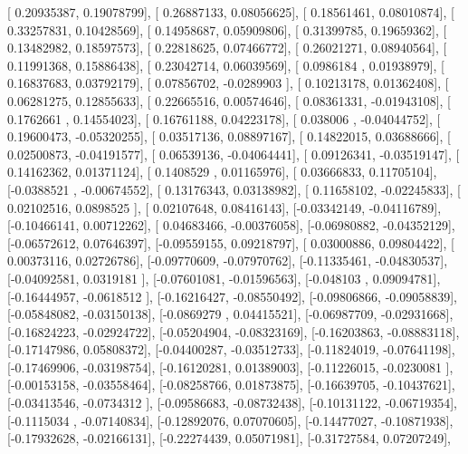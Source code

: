\documentclass{article}
\begin{document}
       [ 0.20935387,  0.19078799],
       [ 0.26887133,  0.08056625],
       [ 0.18561461,  0.08010874],
       [ 0.33257831,  0.10428569],
       [ 0.14958687,  0.05909806],
       [ 0.31399785,  0.19659362],
       [ 0.13482982,  0.18597573],
       [ 0.22818625,  0.07466772],
       [ 0.26021271,  0.08940564],
       [ 0.11991368,  0.15886438],
       [ 0.23042714,  0.06039569],
       [ 0.0986184 ,  0.01938979],
       [ 0.16837683,  0.03792179],
       [ 0.07856702, -0.0289903 ],
       [ 0.10213178,  0.01362408],
       [ 0.06281275,  0.12855633],
       [ 0.22665516,  0.00574646],
       [ 0.08361331, -0.01943108],
       [ 0.1762661 ,  0.14554023],
       [ 0.16761188,  0.04223178],
       [ 0.038006  , -0.04044752],
       [ 0.19600473, -0.05320255],
       [ 0.03517136,  0.08897167],
       [ 0.14822015,  0.03688666],
       [ 0.02500873, -0.04191577],
       [ 0.06539136, -0.04064441],
       [ 0.09126341, -0.03519147],
       [ 0.14162362,  0.01371124],
       [ 0.1408529 ,  0.01165976],
       [ 0.03666833,  0.11705104],
       [-0.0388521 , -0.00674552],
       [ 0.13176343,  0.03138982],
       [ 0.11658102, -0.02245833],
       [ 0.02102516,  0.0898525 ],
       [ 0.02107648,  0.08416143],
       [-0.03342149, -0.04116789],
       [-0.10466141,  0.00712262],
       [ 0.04683466, -0.00376058],
       [-0.06980882, -0.04352129],
       [-0.06572612,  0.07646397],
       [-0.09559155,  0.09218797],
       [ 0.03000886,  0.09804422],
       [ 0.00373116,  0.02726786],
       [-0.09770609, -0.07970762],
       [-0.11335461, -0.04830537],
       [-0.04092581,  0.0319181 ],
       [-0.07601081, -0.01596563],
       [-0.048103  ,  0.09094781],
       [-0.16444957, -0.0618512 ],
       [-0.16216427, -0.08550492],
       [-0.09806866, -0.09058839],
       [-0.05848082, -0.03150138],
       [-0.0869279 ,  0.04415521],
       [-0.06987709, -0.02931668],
       [-0.16824223, -0.02924722],
       [-0.05204904, -0.08323169],
       [-0.16203863, -0.08883118],
       [-0.17147986,  0.05808372],
       [-0.04400287, -0.03512733],
       [-0.11824019, -0.07641198],
       [-0.17469906, -0.03198754],
       [-0.16120281,  0.01389003],
       [-0.11226015, -0.0230081 ],
       [-0.00153158, -0.03558464],
       [-0.08258766,  0.01873875],
       [-0.16639705, -0.10437621],
       [-0.03413546, -0.0734312 ],
       [-0.09586683, -0.08732438],
       [-0.10131122, -0.06719354],
       [-0.1115034 , -0.07140834],
       [-0.12892076,  0.07070605],
       [-0.14477027, -0.10871938],
       [-0.17932628, -0.02166131],
       [-0.22274439,  0.05071981],
       [-0.31727584,  0.07207249],
\end{document}
